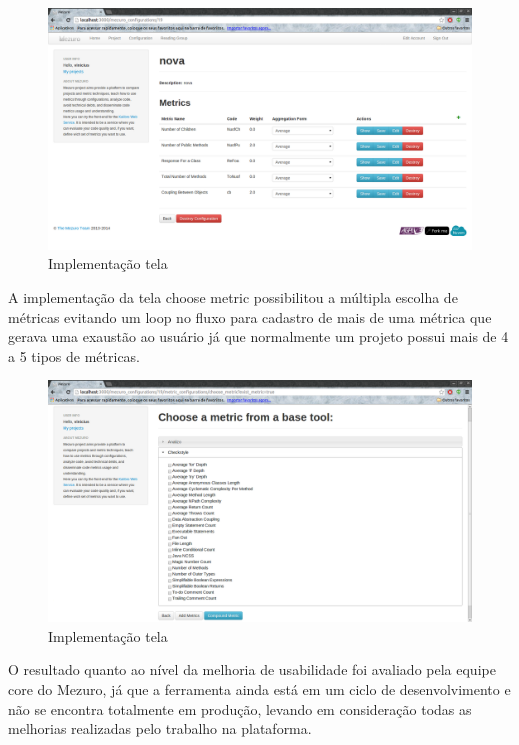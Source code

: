 \graphicspath{{figuras/}}
\begin{figure}[H]
\centering
\includegraphics[width=1.0\textwidth]{configuration}
\caption{Implementação tela}
\label{parallel-coordinate}
\end{figure}

A implementação da tela choose metric possibilitou a múltipla escolha de métricas evitando um loop no fluxo para cadastro de mais de uma métrica que gerava uma exaustão ao usuário já que normalmente um projeto possui mais de 4 a 5 tipos de métricas.

\graphicspath{{figuras/}}
\begin{figure}[H]
\centering
\includegraphics[width=1.0\textwidth]{select_metrics}
\caption{Implementação tela}
\label{parallel-coordinate}
\end{figure}

O resultado quanto ao nível da melhoria de usabilidade foi avaliado pela equipe core do Mezuro, já que a ferramenta ainda está em um ciclo de desenvolvimento e não se encontra totalmente em produção, levando em consideração todas as melhorias realizadas pelo trabalho na plataforma.

